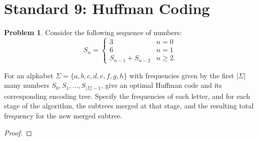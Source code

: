 \documentclass[11pt]{article}
\theoremstyle{definition}
\theoremstyle{definition}
\newtheorem{required}{Problem}
\theoremstyle{definition}
\begin{document}
\section{Standard 9: Huffman Coding}
\begin{required}
Consider the following sequence of numbers:
\[
S_n = \begin{cases}
3 & n = 0 \\
6 & n = 1 \\
S_{n-1} + S_{n-2} & n \geq 2.
\end{cases}
\]

For an alphabet $\Sigma = \{a,b,c,d,e,f,g,h\}$ with frequencies given by the first $|\Sigma|$ many numbers $S_0, S_1, \dotsc, S_{|\Sigma|-1}$, give an optimal Huffman code and its corresponding encoding tree. Specify the frequencies of each letter, and for each stage of the algorithm, the subtrees merged at that stage, and the resulting total frequency for the new merged subtree.
\end{required}

\begin{proof}
\end{proof}



\end{document}
